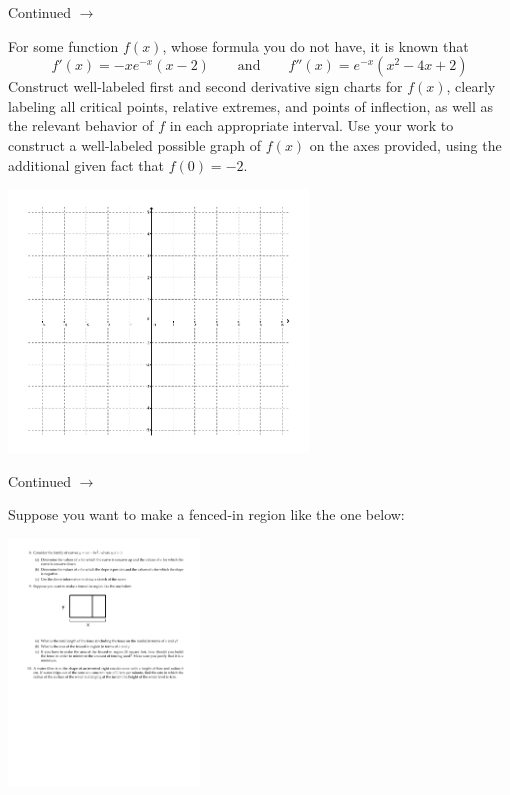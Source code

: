 \documentclass[addpoints]{exam}
\def\pageturn{\vfill
\begin{flushright}
	\begin{small}
		Continued $\rightarrow$
	\end{small}
\end{flushright}
\newpage}
\begin{document}
\begin{questions}


\pageturn



\question[20] For some function $f(x)$, whose formula you do not have, it is known that 
\[ f'(x) = -xe^{-x} (x-2) \qquad \text{and} \qquad f''(x) = e^{-x}(x^2 - 4x + 2) \]
Construct well-labeled first and second derivative sign charts for $f(x)$, clearly labeling all critical points, relative extremes, and points of inflection, as well as the relevant behavior of $f$ in each appropriate interval. Use your work to construct a well-labeled possible graph of $f(x)$ on the axes provided, using the additional given fact that $f(0) = −2$.

\medskip

\includegraphics[width=0.6\textwidth]{a3-axes}


\pageturn


\question Suppose you want to make a fenced-in region like the one below: 
\begin{center}
	\includegraphics[width=2in]{a3-opt}
\end{center}
	\begin{parts}

\end{parts}
\end{questions}
\end{document}
